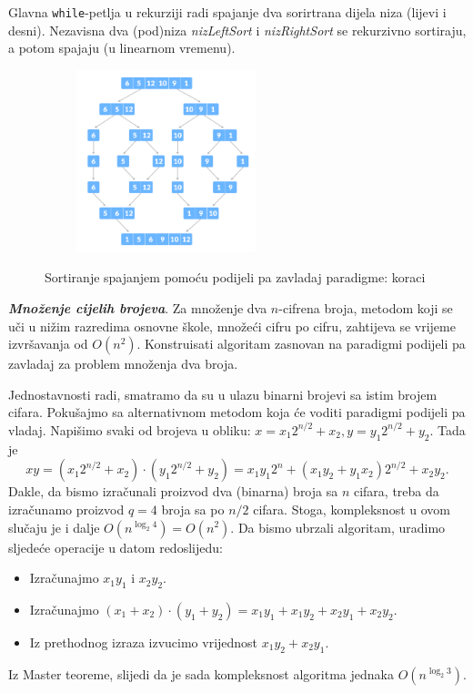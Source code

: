 Glavna \texttt{while}-petlja u rekurziji radi spajanje dva sorirtrana dijela niza (lijevi i desni). Nezavisna dva (pod)niza \textit{nizLeftSort} i \textit{nizRightSort} se rekurzivno sortiraju, a potom spajaju (u linearnom vremenu).

 \begin{figure}
 	\centering
 	\includegraphics[width=200pt,height=150pt]{slike/merge-sort-example.png}
 	\label{fig:merge-sort}
 	\caption{Sortiranje spajanjem pomoću podijeli pa zavladaj paradigme: koraci}
 \end{figure}

\begin{example}

\textbf{\textit{Množenje cijelih brojeva}}. Za  množenje dva $n$-cifrena broja, metodom koji se uči u nižim razredima osnovne škole, množeći cifru po cifru, zahtijeva se vrijeme izvršavanja od $O(n^2)$.  Konstruisati algoritam zasnovan na paradigmi podijeli pa zavladaj za problem množenja dva broja. 
\end{example}
\begin{solution}
 
 
 Jednostavnosti radi, smatramo da su u ulazu binarni brojevi sa istim brojem cifara.
Pokušajmo sa alternativnom metodom koja će voditi paradigmi podijeli pa vladaj.  Napišimo svaki od brojeva u obliku: $x= x_1 2^{n/2} + x_2, y= y_1 2^{n/2} + y_2$.
Tada je 
$$ xy = (x_1 2^{n/2} + x_2) \cdot (y_1 2^{n/2} + y_2) = x_1 y_1 2^n + (x_1 y_2 + y_1 x_2)2^{n/2} + x_2y_2.$$
Dakle, da bismo izračunali proizvod dva (binarna) broja sa $n$ cifara, treba da izračunamo proizvod $q=4$ broja sa po $n/2$ cifara. Stoga, kompleksnost u ovom slučaju je i dalje $O(n^{\log_2 4}) = O(n^2)$. Da bismo ubrzali algoritam,   uradimo sljedeće operacije u datom redoslijedu:
\begin{itemize}
	\item Izračunajmo $x_1y_1$ i $x_2 y_2$.
	\item Izračunajmo $(x_1 + x_2 ) \cdot (y_1 + y_2) = x_1y_1 + x_1y_2 + x_2 y_1 + x_2 y_2$.
	\item Iz prethodnog izraza izvucimo vrijednost $x_1 y_2 + x_2 y_1$.
\end{itemize}
Iz Master teoreme, slijedi da je sada kompleksnost algoritma jednaka $O(n^{\log_2 3})$.
\end{solution}

